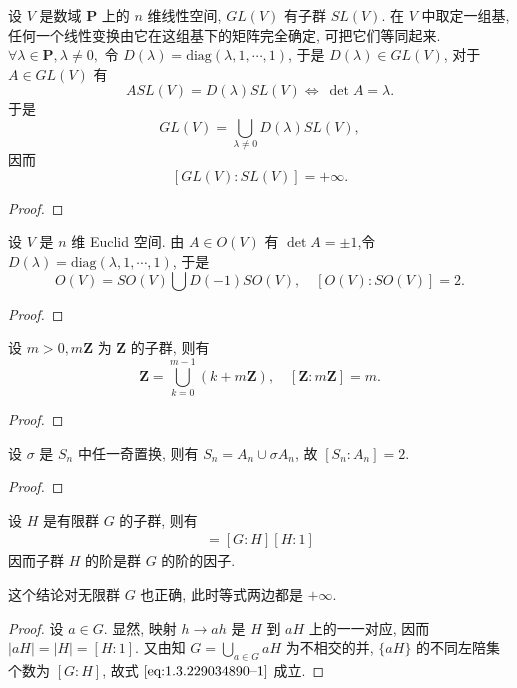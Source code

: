 \documentclass[../../main.tex]{subfiles}
\begin{document}
\begin{example}
设 \( V \) 是数域 \( \mathbf{P} \) 上的 \( n \) 维线性空间, \( GL(V) \) 有子群 \( SL(V) \). 在 \( V \) 中取定一组基, 任何一个线性变换由它在这组基下的矩阵完全确定, 可把它们等同起来.\( \forall \lambda \in \mathbf{P}, \lambda \neq 0, \) 令 \( D(\lambda) = \text{diag}(\lambda, 1, \cdots, 1) \), 于是 \( D(\lambda) \in GL(V) \), 对于 \( A \in GL(V) \) 有
\[
A SL(V) = D(\lambda) SL(V)\iff \ \det A = \lambda.
\]
于是
\[
GL(V) = \bigcup_{\lambda \neq 0} D(\lambda) SL(V),
\]
因而
\[
[GL(V): SL(V)] = +\infty.
\]
\end{example}
\begin{proof}


\end{proof}

\begin{example}
设 \( V \) 是 \( n \) 维 Euclid 空间. 由 \( A \in O(V) \) 有 \( \det A = \pm 1 \),令 \( D(\lambda) = \text{diag}(\lambda, 1, \cdots, 1) \),  于是
\[
O(V) = SO(V) \bigcup D(-1) SO(V),
\quad
[O(V): SO(V)] = 2.
\]
\end{example}
\begin{proof}


\end{proof}

\begin{example}
设 \( m > 0, m\mathbf{Z} \) 为 \( \mathbf{Z} \) 的子群, 则有
\[
\mathbf{Z} = \bigcup_{k=0}^{m-1} (k + m\mathbf{Z}), \quad [\mathbf{Z}: m\mathbf{Z}] = m.
\]
\end{example}
\begin{proof}


\end{proof}

\begin{example}
设 \( \sigma \) 是 \( S_n \) 中任一奇置换, 则有 \( S_n = A_n \cup \sigma A_n \), 故 \( [S_n: A_n] = 2 \).
\end{example}
\begin{proof}


\end{proof}

\begin{theorem}[Lagrange定理]\label{theorem:抽象代数-Lagrange定理-定理 1.3.3}
设 \( H \) 是有限群 \( G \) 的子群, 则有
\begin{align}
[G:1] = [G:H][H:1] \label{eq:1.3.229034890--1}
\end{align}
因而子群 \( H \) 的阶是群 \( G \) 的阶的因子.
\end{theorem}
\begin{remark}
这个结论对无限群 \( G \) 也正确, 此时等式两边都是 \( +\infty \).
\end{remark}
\begin{proof}
设 \( a \in G \). 显然, 映射 \( h \to ah \) 是 \( H \) 到 \( aH \) 上的一一对应, 因而 \( |aH| = |H| = [H:1] \). 又由知 \( G = \bigcup\limits_{a \in G} aH \) 为不相交的并, \( \{aH\} \) 的不同左陪集个数为 \( [G:H] \), 故式 \(\eqref{eq:1.3.229034890--1}\) 成立.

\end{proof}
\end{document}
